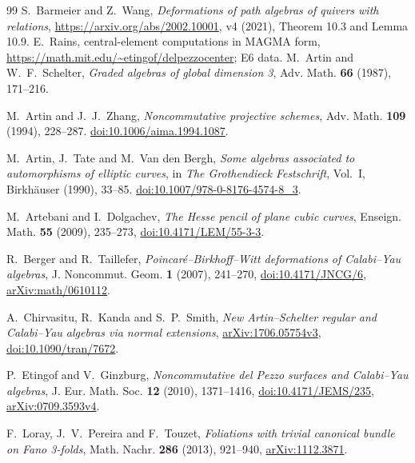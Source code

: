 \documentclass[11pt,a4paper]{ltjsarticle}
\numberwithin{equation}{section}
\begin{document}

\begin{thebibliography}{99}
 S.~Barmeier and Z.~Wang,
\emph{Deformations of path algebras of quivers with relations},
\url{https://arxiv.org/abs/2002.10001}, v4 (2021), Theorem 10.3 and Lemma 10.9.
 E.~Rains, central-element computations in MAGMA form,
\url{https://math.mit.edu/~etingof/delpezzocenter}; E6 data.
M.~Artin and W.~F.~Schelter,
\textit{Graded algebras of global dimension 3},
Adv. Math. \textbf{66} (1987), 171--216.

M.~Artin and J.~J.~Zhang,
\textit{Noncommutative projective schemes},
Adv. Math. \textbf{109} (1994), 228--287.
\href{https://doi.org/10.1006/aima.1994.1087}{doi:10.1006/aima.1994.1087}.

M.~Artin, J.~Tate and M.~Van den Bergh,
\textit{Some algebras associated to automorphisms of elliptic curves},
in \textit{The Grothendieck Festschrift}, Vol.~I,
Birkh\"auser (1990), 33--85.
\href{https://doi.org/10.1007/978-0-8176-4574-8_3}{doi:10.1007/978-0-8176-4574-8\_3}.

M.~Artebani and I.~Dolgachev,
\textit{The Hesse pencil of plane cubic curves},
Enseign. Math. \textbf{55} (2009), 235--273,
\href{https://doi.org/10.4171/LEM/55-3-3}{doi:10.4171/LEM/55-3-3}.

R.~Berger and R.~Taillefer,
\textit{Poincar\'e--Birkhoff--Witt deformations of Calabi--Yau algebras},
J. Noncommut. Geom. \textbf{1} (2007), 241--270,
\href{https://doi.org/10.4171/JNCG/6}{doi:10.4171/JNCG/6},
\href{https://arxiv.org/abs/math/0610112}{arXiv:math/0610112}.

A.~Chirvasitu, R.~Kanda and S.~P.~Smith,
\textit{New Artin--Schelter regular and Calabi--Yau algebras via normal extensions},
\href{https://arxiv.org/abs/1706.05754}{arXiv:1706.05754v3},
\href{https://doi.org/10.1090/tran/7672}{doi:10.1090/tran/7672}.

P.~Etingof and V.~Ginzburg,
\textit{Noncommutative del Pezzo surfaces and Calabi--Yau algebras},
J. Eur. Math. Soc. \textbf{12} (2010), 1371--1416,
\href{https://doi.org/10.4171/JEMS/235}{doi:10.4171/JEMS/235},
\href{https://arxiv.org/abs/0709.3593}{arXiv:0709.3593v4}.

F.~Loray, J.~V.~Pereira and F.~Touzet,
\textit{Foliations with trivial canonical bundle on Fano 3-folds},
Math. Nachr. \textbf{286} (2013), 921--940,
\href{https://arxiv.org/abs/1112.3871}{arXiv:1112.3871}.


\end{thebibliography}
\end{document}
